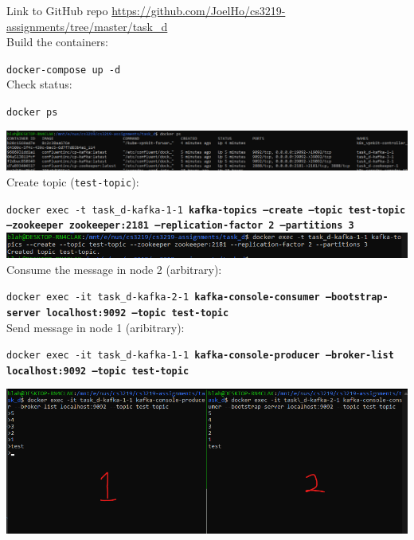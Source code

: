 \documentclass{article}
\begin{document}
    Link to GitHub repo \href{https://github.com/JoelHo/cs3219-assignments/tree/master/task_d}{https://github.com/JoelHo/cs3219-assignments/tree/master/task\_d}\\

    Build the containers:

    \texttt{docker-compose up -d}\\

    Check status:

    \texttt{docker ps}

    \includegraphics[width=\textwidth]{img/status.png}\\

    Create topic (\texttt{test-topic}):

    \texttt{docker exec -t task\_d-kafka-1-1 \textbf{kafka-topics --create --topic test-topic --zookeeper zookeeper:2181 --replication-factor 2 --partitions 3} }\\

    \includegraphics[width=\textwidth]{img/createTopic.png}\\

    Consume the message in node 2 (arbitrary):

    \texttt{docker exec -it task\_d-kafka-2-1 \textbf{kafka-console-consumer --bootstrap-server localhost:9092 --topic test-topic}}\\


    Send message in node 1 (aribitrary):

    \texttt{docker exec -it task\_d-kafka-1-1 \textbf{kafka-console-producer --broker-list localhost:9092 --topic test-topic}}

    \includegraphics[width=\textwidth]{img/message.png}\\
\end{document}
